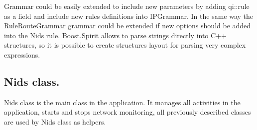 \documentclass[thesis=M,english]{FITthesis}[2011/07/15]
\begin{document}
Grammar could be easily extended to include new parameters by adding qi::rule as a field and include new rules definitions into IPGrammar. In the same way the RuleRouteGrammar grammar could be extended if new options should be added into the Nids rule. Boost.Spirit allows to parse strings directly into C++ structures, so it is possible to create structures layout for parsing very complex expressions.

\subsection{Nids class.}

Nids class is the main class in the application. It manages all activities in the application, starts and stops network monitoring, all previously described classes are used by Nids class as helpers. 
\end{document}
